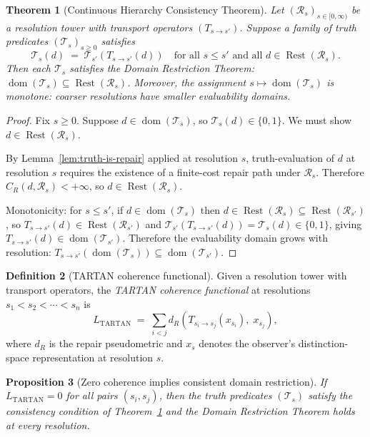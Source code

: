 \documentclass[12pt, oneside]{article}
\theoremstyle{plain}
\newtheorem{theorem}{Theorem}[section]
\newtheorem{proposition}[theorem]{Proposition}
\theoremstyle{definition}
\newtheorem{definition}[theorem]{Definition}
\theoremstyle{remark}
\DeclareMathOperator{\Rest}{Rest}
\newcommand{\CR}{C_{\!R}}
\newcommand{\Tsub}{\mathcal{T}}
\begin{document}
\begin{theorem}[Continuous Hierarchy Consistency Theorem]
  Let $(\mathcal{R}_s)_{s \in [0,\infty)}$ be a resolution tower
  with transport operators $(T_{s \to s'})$.
  Suppose a family of truth predicates $(\Tsub_s)_{s \geq 0}$
  satisfies
  \[
    \Tsub_s(d) \;=\; \Tsub_{s'}(T_{s \to s'}(d))
    \quad\text{for all } s \leq s' \text{ and all }
    d \in \Rest(\mathcal{R}_s).
  \]
  Then each $\Tsub_s$ satisfies the Domain Restriction Theorem:
  $\operatorname{dom}(\Tsub_s) \subseteq \Rest(\mathcal{R}_s)$.
  Moreover, the assignment $s \mapsto \operatorname{dom}(\Tsub_s)$
  is monotone: coarser resolutions have smaller evaluability domains.
  \label{thm:continuous-hierarchy}
\end{theorem}

\begin{proof}
  Fix $s \geq 0$.
  Suppose $d \in \operatorname{dom}(\Tsub_s)$, so
  $\Tsub_s(d) \in \{0,1\}$.
  We must show $d \in \Rest(\mathcal{R}_s)$.

  By Lemma~\ref{lem:truth-is-repair} applied at resolution $s$,
  truth-evaluation of $d$ at resolution $s$ requires the existence
  of a finite-cost repair path under $\mathcal{R}_s$.
  Therefore $\CR(d, \mathcal{R}_s) < +\infty$, so
  $d \in \Rest(\mathcal{R}_s)$.

  Monotonicity: for $s \leq s'$, if $d \in \operatorname{dom}(\Tsub_s)$
  then $d \in \Rest(\mathcal{R}_s) \subseteq \Rest(\mathcal{R}_{s'})$,
  so $T_{s \to s'}(d) \in \Rest(\mathcal{R}_{s'})$ and
  $\Tsub_{s'}(T_{s \to s'}(d)) = \Tsub_s(d) \in \{0,1\}$,
  giving $T_{s \to s'}(d) \in \operatorname{dom}(\Tsub_{s'})$.
  Therefore the evaluability domain grows with resolution:
  $T_{s \to s'}(\operatorname{dom}(\Tsub_s)) \subseteq
  \operatorname{dom}(\Tsub_{s'})$.
\end{proof}

\begin{definition}[TARTAN coherence functional]
  Given a resolution tower with transport operators, the
  \emph{TARTAN coherence functional} at resolutions
  $s_1 < s_2 < \cdots < s_n$ is
  \[
    L_{\mathrm{TARTAN}}
    \;=\;
    \sum_{i < j}
    d_R\!\left(
      T_{s_i \to s_j}(x_{s_i}),\; x_{s_j}
    \right),
  \]
  where $d_R$ is the repair pseudometric and $x_s$ denotes the
  observer's distinction-space representation at resolution $s$.
  \label{def:tartan-loss}
\end{definition}

\begin{proposition}[Zero coherence implies consistent domain restriction]
  If $L_{\mathrm{TARTAN}} = 0$ for all pairs $(s_i, s_j)$,
  then the truth predicates $(\Tsub_s)$ satisfy the consistency
  condition of Theorem~\ref{thm:continuous-hierarchy} and the
  Domain Restriction Theorem holds at every resolution.
  \label{prop:tartan-zero}
\end{proposition}
\end{document}
